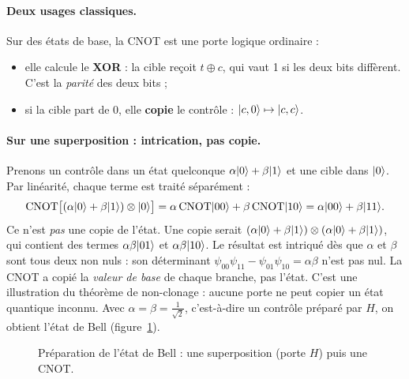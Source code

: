 \paragraph{Deux usages classiques.} Sur des états de base, la CNOT est une porte logique ordinaire :
\begin{itemize}
\item elle calcule le \textbf{XOR} : la cible reçoit $t\oplus c$, qui vaut 1 si les deux bits diffèrent. C'est la \emph{parité} des deux bits ;
\item si la cible part de 0, elle \textbf{copie} le contrôle : $\lvert c,0\rangle\mapsto\lvert c,c\rangle$.
\end{itemize}

\paragraph{Sur une superposition : intrication, pas copie.} Prenons un contrôle dans un état quelconque $\alpha\lvert 0\rangle+\beta\lvert 1\rangle$ et une cible dans $\lvert 0\rangle$. Par linéarité, chaque terme est traité séparément :
\[
\mathrm{CNOT}\big[(\alpha\lvert 0\rangle+\beta\lvert 1\rangle)\otimes\lvert 0\rangle\big]=\alpha\,\mathrm{CNOT}\lvert 00\rangle+\beta\,\mathrm{CNOT}\lvert 10\rangle=\alpha\lvert 00\rangle+\beta\lvert 11\rangle.
\]
Ce n'est \emph{pas} une copie de l'état. Une copie serait $(\alpha\lvert 0\rangle+\beta\lvert 1\rangle)\otimes(\alpha\lvert 0\rangle+\beta\lvert 1\rangle)$, qui contient des termes $\alpha\beta\lvert 01\rangle$ et $\alpha\beta\lvert 10\rangle$. Le résultat est intriqué dès que $\alpha$ et $\beta$ sont tous deux non nuls : son déterminant $\psi_{00}\psi_{11}-\psi_{01}\psi_{10}=\alpha\beta$ n'est pas nul. La CNOT a copié la \emph{valeur de base} de chaque branche, pas l'état. C'est une illustration du théorème de non-clonage : aucune porte ne peut copier un état quantique inconnu. Avec $\alpha=\beta=\tfrac1{\sqrt2}$, c'est-à-dire un contrôle préparé par $H$, on obtient l'état de Bell (figure~\ref{fig:bell}).

\begin{figure}[htbp]
\centering
{}
\caption{Préparation de l'état de Bell : une superposition (porte $H$) puis une CNOT.}\label{fig:bell}
\end{figure}


